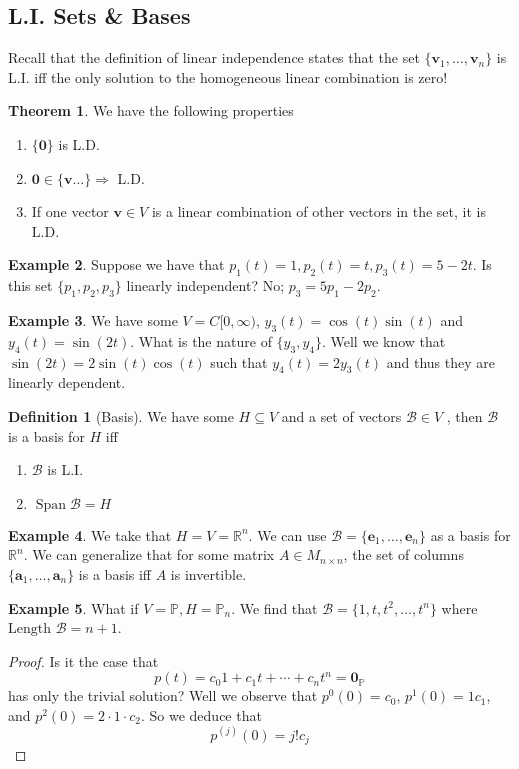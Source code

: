 \documentclass{article}
\numberwithin{equation}{section}
\theoremstyle{definition}
\newtheorem{thm}{Theorem}[subsection]
\newtheorem{defn}{Definition}[subsection]
\newtheorem{ex}[thm]{Example}
\newcommand{\V}{\mathbf{v}}
\newcommand{\R}{\mathbb{R}}
\DeclareMathOperator{\spa}{Span}
\newcommand{\x}{\times}
\theoremstyle{adefn}
\begin{document}
	\subsection{L.I. Sets \& Bases}
	Recall that the definition of linear independence states that the set $\{ \V_1, \ldots, \V_n \}$ is L.I. iff the only solution to the homogeneous linear combination is zero! 
	\begin{thm}
		We have the following properties
		\begin{enumerate}
			\itemsep0em
			\item $\{\textbf{0}\}$ is L.D.
			\item $\textbf{0} \in \{\textbf{v}\ldots\} \Rightarrow$ L.D.
			\item If one vector $\V \in V$ is a linear combination of other vectors in the set, it is L.D.
		\end{enumerate}
	\end{thm}
	\begin{ex}
		Suppose we have that $p_1(t) = 1, p_2(t) = t, p_3(t) = 5-2t$. Is this set $\{p_1, p_2, p_3\}$ linearly independent? No; $p_3 = 5p_1 - 2p_2$. 
	\end{ex}
	\begin{ex}
		We have some $V = C[0, \infty)$, $y_3(t) = \cos(t)\sin(t)$ and $y_4(t) = \sin(2t)$. What is the nature of $\{y_3, y_4\}$. Well we know that $\sin(2t) = 2\sin(t)\cos(t)$ such that $y_4(t) = 2y_3(t)$ and thus they are linearly dependent. 
	\end{ex}
	\begin{defn}[Basis]
		We have some $H \subseteq V$ and a set of vectors $\mathcal{B} \in V$ , then $\mathcal{B}$ is a basis for $H$ iff
		\begin{enumerate}
			\itemsep0em
			\item $\mathcal{B}$ is L.I.
			\item $\spa\mathcal{B} = H$
		\end{enumerate}
	\end{defn}
	\begin{ex}
		We take that $H = V = \R^n$. We can use $\mathcal{B} = \{\mathbf{e}_1, \ldots, \mathbf{e}_n\}$ as a basis for $\R^n$. We can generalize that for some matrix $A \in M_{n \x n}$, the set of columns $\{\mathbf{a}_1, \ldots, \mathbf{a}_n\}$ is a basis iff $A$ is invertible. 
	\end{ex}
	\begin{ex}
		What if $V = \mathbb{P}, H = \mathbb{P}_n$. We find that $\mathcal{B} = \{1, t, t^2, \ldots, t^n\}$ where $\text{Length }\mathcal{B} = n+1$. 
		\begin{proof}
			Is it the case that 
			$$p(t) = c_0 1 + c_1 t + \cdots + c_n t^n = \mathbf{0}_\mathbb{P}$$
			has only the trivial solution? Well we observe that $p^0(0) = c_0$, $p^1(0) = 1c_1$, and $p^2(0) = 2\cdot 1\cdot c_2$. So we deduce that 
			$$p^{(j)}(0) = j!c_j$$
		\end{proof}
	\end{ex}
\end{document}
